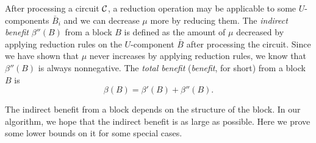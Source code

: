\documentclass[runningheads]{llncs}
\begin{document}
After processing a circuit ${\cal C}$, a reduction operation may be applicable to some $U$-components $\bar{B}_i$
 and we can decrease $\mu$ more by reducing them. The \emph{indirect benefit} $\beta''(B)$ from a block $B$ is defined as the amount of $\mu$ decreased by applying reduction rules on the $U$-component $\bar{B}$ after processing the circuit. Since we have shown that $\mu$ never increases by applying reduction rules, we know that $\beta''(B)$  is always nonnegative. The \emph{total benefit} (\emph{benefit}, for short) from a block $B$ is
$$\beta(B)=\beta'(B)+\beta''(B).$$

\bigskip

The indirect benefit from a block depends on the structure of the block.
In our algorithm, we hope that the indirect benefit is as large as possible.
Here we prove some lower bounds on it for some special cases.
\end{document}
